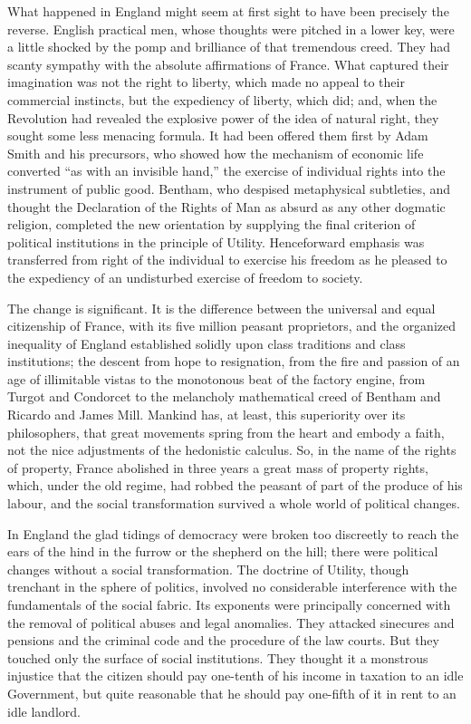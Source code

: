 \documentclass{book}
\begin{document}
What happened in England might seem at first sight to have been precisely the reverse. English practical men, whose thoughts were pitched in a lower key, were a little shocked by the pomp and brilliance of that tremendous creed. They had scanty sympathy with the absolute affirmations of France. What captured their imagination was not the right to liberty, which made no appeal to their commercial instincts, but the expediency of liberty, which did; and, when the Revolution had revealed the explosive power of the idea of natural right, they sought some less menacing formula. It had been offered them first by Adam Smith and his precursors, who showed how the mechanism of economic life converted “as with an invisible hand,” the exercise of individual rights into the instrument of public good. Bentham, who despised metaphysical subtleties, and thought the Declaration of the Rights of Man as absurd as any other dogmatic religion, completed the new orientation by supplying the final criterion of political institutions in the principle of Utility. Henceforward emphasis was transferred from right of the individual to exercise his freedom as he pleased to the expediency of an undisturbed exercise of freedom to society.

The change is significant. It is the difference between the universal and equal citizenship of France, with its five million peasant proprietors, and the organized inequality of England established solidly upon class traditions and class institutions; the descent from hope to resignation, from the fire and passion of an age of illimitable vistas to the monotonous beat of the factory engine, from Turgot and Condorcet to the melancholy mathematical creed of Bentham and Ricardo and James Mill. Mankind has, at least, this superiority over its philosophers, that great movements spring from the heart and embody a faith, not the nice adjustments of the hedonistic calculus. So, in the name of the rights of property, France abolished in three years a great mass of property rights, which, under the old regime, had robbed the peasant of part of the produce of his labour, and the social transformation survived a whole world of political changes.

In England the glad tidings of democracy were broken too discreetly to reach the ears of the hind in the furrow or the shepherd on the hill; there were political changes without a social transformation. The doctrine of Utility, though trenchant in the sphere of politics, involved no considerable interference with the fundamentals of the social fabric. Its exponents were principally concerned with the removal of political abuses and legal anomalies. They attacked sinecures and pensions and the criminal code and the procedure of the law courts. But they touched only the surface of social institutions. They thought it a monstrous injustice that the citizen should pay one-tenth of his income in taxation to an idle Government, but quite reasonable that he should pay one-fifth of it in rent to an idle landlord.
\end{document}
